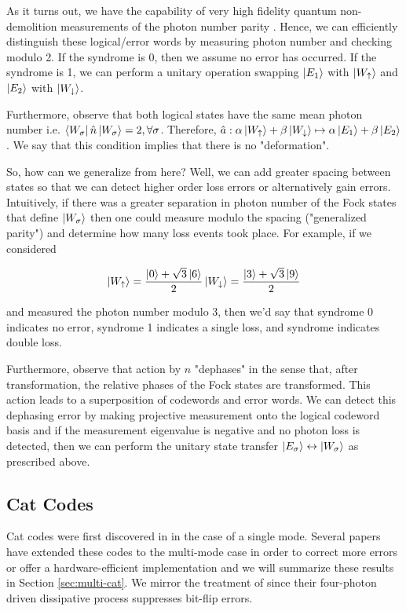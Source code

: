 \documentclass[12]{amsart}
\newcommand\0{\mathbf{0}}
\newcommand\<{\langle}
\renewcommand\>{\rangle}
\begin{document}
As it turns out, we have the capability of very high fidelity quantum non-demolition measurements of the photon number parity \cite{sun2014tracking}. Hence, we can efficiently distinguish these logical/error words by measuring photon number and checking modulo 2. If the syndrome is 0, then we assume no error has occurred. If the syndrome is 1, we can perform a unitary operation swapping $\ket{E_1}$ with $\ket{W_\uparrow}$ and $\ket{E_2}$ with $\ket{W_\downarrow}$.

Furthermore, observe that both logical states have the same mean photon number i.e. $\bra{W_\sigma} \hat{n} \ket{W_\sigma} = 2, \forall \sigma$. Therefore, $\hat{a} : \alpha\ket{W_\uparrow} + \beta\ket{W_\downarrow} \mapsto \alpha \ket{E_1} + \beta \ket{E_2}$. We say that this condition implies that there is no "deformation".

So, how can we generalize from here? Well, we can add greater spacing between states so that we can detect higher order loss errors or alternatively gain errors. Intuitively, if there was a greater separation in photon number of the Fock states that define $\ket{W_\sigma}$ then one could measure modulo the spacing ("generalized parity") and determine how many loss events took place. For example, if we considered

$$
\ket{W_\uparrow} = \frac{\ket{0} + \sqrt{3}\ket{6}}{2}\\
\ket{W_\downarrow} = \frac{\ket{3} + \sqrt{3}\ket{9}}{2}
$$

and measured the photon number modulo 3, then we'd say that syndrome 0 indicates no error, syndrome 1 indicates a single loss, and syndrome indicates double loss.

 Furthermore, observe that action by $n$ "dephases" in the sense that, after transformation, the relative phases of the Fock states are transformed. This action leads to a superposition of codewords and error words. We can detect this dephasing error by making projective measurement onto the logical codeword basis and if the measurement eigenvalue is negative and no photon loss is detected, then we can perform the unitary state transfer $\ket{E_\sigma} \leftrightarrow \ket{W_\sigma}$ as prescribed above.
 
\subsection{Cat Codes}

Cat codes were first discovered in \cite{cochrane1999macroscopically} in the case of a single mode. Several papers have extended these codes to the multi-mode case in order to correct more errors or offer a hardware-efficient implementation \cite{albert2018multimode, leghtas2013hardware, mirrahimi2014dynamically} and we will summarize these results in Section \ref{sec:multi-cat}. We mirror the treatment of \cite{mirrahimi2014dynamically} since their four-photon driven dissipative process suppresses bit-flip errors.
\end{document}
